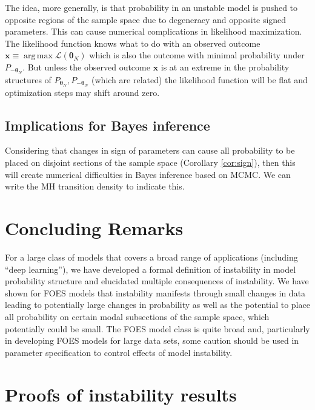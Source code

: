 \documentclass[]{article}
\theoremstyle{definition}
\DeclareMathOperator*{\argmax}{arg\,max}
\begin{document}
The idea, more generally, is that probability in an unstable model is
pushed to opposite regions of the sample space due to degeneracy and
opposite signed parameters. This can cause numerical complications in
likelihood maximization. The likelihood function knows what to do with
an observed outcome
\(\boldsymbol x \equiv \argmax \mathcal{L}(\boldsymbol \theta_N)\) which
is also the outcome with minimal probability under
\(P_{-\boldsymbol \theta_N}\). But unless the observed outcome
\(\boldsymbol x\) is at an extreme in the probability structures of
\(P_{\boldsymbol \theta_N}, P_{-\boldsymbol \theta_N}\) (which are
related) the likelihood function will be flat and optimization steps may
shift around zero.

\subsection{Implications for Bayes
inference}\label{implications-for-bayes-inference}

Considering that changes in sign of parameters can cause all probability
to be placed on disjoint sections of the sample space (Corollary
\ref{cor:sign}), then this will create numerical difficulties in Bayes
inference based on MCMC. We can write the MH transition density to
indicate this.

\section{Concluding Remarks}\label{conclusions}

For a large class of models that covers a broad range of applications
(including ``deep learning''), we have developed a formal definition of
instability in model probability structure and elucidated multiple
consequences of instability. We have shown for FOES models that
instability manifests through small changes in data leading to
potentially large changes in probability as well as the potential to
place all probability on certain modal subsections of the sample space,
which potentially could be small. The FOES model class is quite broad
and, particularly in developing FOES models for large data sets, some
caution should be used in parameter specification to control effects of
model instability.

\clearpage

\appendix


\section{Proofs of instability results}\label{appendix-instab}
\end{document}
